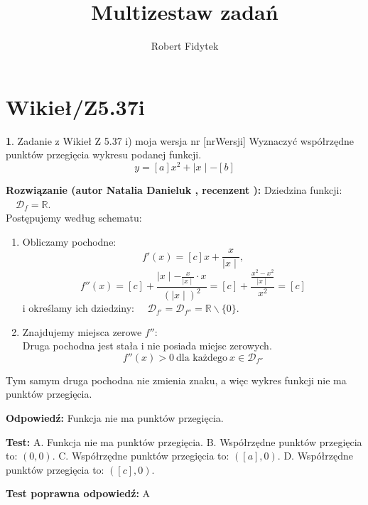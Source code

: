 \documentclass[12pt, a4paper]{article}
\title{Multizestaw zadań}
\author{Robert Fidytek}
\date{}
\theoremstyle{definition} %
\newtheorem{zad}{}
\newcommand{\kategoria}[1]{\section{#1}} %
\newcommand{\zadStart}[1]{\begin{zad}#1\newline} %
\newcommand{\zadStop}{\end{zad}}   %
\newcommand{\rozwStart}[2]{\noindent \textbf{Rozwiązanie (autor #1 , recenzent #2): }\newline} %
\newcommand{\rozwStop}{\newline}                                            %
\newcommand{\odpStart}{\noindent \textbf{Odpowiedź:}\newline}    %
\newcommand{\odpStop}{\newline}                                             %
\newcommand{\testStart}{\noindent \textbf{Test:}\newline} %
\newcommand{\testStop}{\newline} %
\newcommand{\kluczStart}{\noindent \textbf{Test poprawna odpowiedź:}\newline} %
\newcommand{\kluczStop}{\newline} %
\begin{document}
\maketitle

\kategoria{Wikieł/Z5.37i}

\zadStart{Zadanie z Wikieł Z 5.37 i) moja wersja nr [nrWersji]}
Wyznaczyć współrzędne punktów przegięcia wykresu podanej funkcji.
$$y =  [a]x^2 + \mid x \mid - [b]$$
\zadStop

\rozwStart{Natalia Danieluk}{}
Dziedzina funkcji: $\quad \mathcal{D}_f=\mathbb{R}$. \\
Postępujemy według schematu:
\begin{enumerate}
\item Obliczamy pochodne: 
$$f'(x) = [c]x + \frac{x}{\mid x \mid},$$ 
$$f''(x) = [c] + \frac{\mid x \mid - \frac{x}{\mid x \mid}\cdot x}{(\mid x \mid)^2} = [c] + \frac{\frac{x^2-x^2}{\mid x \mid}}{x^2} = [c]$$
i określamy ich dziedziny: $\quad \mathcal{D}_{f'}=\mathcal{D}_{f''}=\mathbb{R}\backslash\{0\}$. \\
\item Znajdujemy miejsca zerowe $f''$: \\
Druga pochodna jest stała i nie posiada miejsc zerowych.
$$f''(x) > 0 \ \text{dla każdego} \ x \in \mathcal{D}_{f''}$$
\end{enumerate}
Tym samym druga pochodna nie zmienia znaku, a więc wykres funkcji nie ma punktów przegięcia.
\rozwStop

\odpStart
Funkcja nie ma punktów przegięcia.
\odpStop

\testStart
A. Funkcja nie ma punktów przegięcia.
B. Współrzędne punktów przegięcia to: $(0,0)$.
C. Współrzędne punktów przegięcia to:  $([a],0)$.
D. Współrzędne punktów przegięcia to:  $([c],0)$.
\testStop

\kluczStart
A
\kluczStop
\end{document}
